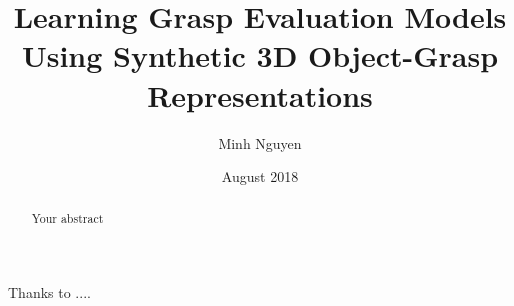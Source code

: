 \documentclass[rnd]{mas_report}
\author{Minh Nguyen}
\title{Learning Grasp Evaluation Models Using Synthetic 3D Object-Grasp Representations}
\date{August 2018}
\begin{document}
\begin{titlepage}
    \maketitle
\end{titlepage}


\pagestyle{plain}


\cleardoublepage
\statementpage

\begin{abstract}
Your abstract
\end{abstract}


\begin{acknowledgements}
Thanks to ....
\end{acknowledgements}


\tableofcontents
\listoffigures
\listoftables


\mainmatter %

\pagestyle{mainmatter}









\begin{appendices}


\end{appendices}

\backmatter



\end{document}
